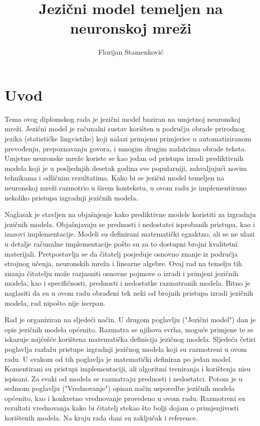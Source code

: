 \documentclass[times, utf8, diplomski, numeric]{fer}
\begin{document}
\title{Jezični model temeljen na neuronskoj mreži}

\author{Florijan Stamenković}

\maketitle



\afterpage{\null\newpage}

\tableofcontents

\chapter{Uvod}

Tema ovog diplomskog rada je jezični model baziran na umjetnoj neuronskoj mreži. Jezični model je računalni sustav korišten u području obrade prirodnog jezika (statističke lingvistike) koji nalazi primjenu primjerice u automatiziranom prevođenju, prepoznavanju govora, i mnogim drugim zadatcima obrade teksta. Umjetne neuronske mreže koriste se kao jedan od pristupa izradi prediktivnih modela koji je u posljednjih desetak godina sve popularniji, zahvaljujući novim tehnikama i odličnim rezultatima. Kako bi se jezični model temeljen na neuronskoj mreži razmotrio u širem kontekstu, u ovom radu je implementirano nekoliko pristupa izgradnji jezičnih modela.

Naglasak je stavljen na objašnjenje kako prediktivne modele koristiti za izgradnju jezičnih modela. Objašnjavaju se prednosti i nedostatci isprobanih pristupa, kao i izazovi implementacije. Modeli su definirani matematički egzaktno, ali se ne ulazi u detalje računalne implementacije pošto su za to dostupni brojni kvalitetni materijali. Pretpostavlja se da čitatelj posjeduje osnovno znanje iz područja strojnog učenja, neuronskih mreža i linearne algebre. Ovaj rad na temelju tih znanja čitatelju može razjasniti osnovne pojmove o izradi i primjeni jezičnih modela, kao i specifičnosti, prednosti i nedostatke razmatranih modela. Bitno je naglasiti da su u ovom radu obrađeni tek neki od brojnih pristupa izradi jezičnih modela, rad nipošto nije iscrpan.

Rad je organiziran na sljedeći način. U drugom poglavlju ("Jezični model") dan je opis jezičnih modela općenito. Razmatra se njihova svrha, moguće primjene te se iskazuje najčešće korištena matematička definicija jezičnog modela. Sljedeća četiri poglavlja razlažu pristupe izgradnji jezičnog modela koji su razmotreni u ovom radu. U svakom od tih poglavlja je matematički definiran po jedan model. Komentirani su pristupi implementaciji, ali algoritmi treniranja i korištenja nisu ispisani. Za svaki od modela se razmatraju prednosti i nedostatci. Potom je u sedmom poglavlju ("Vrednovanje") opisan način usporedbe jezičnih modela općenito, kao i konkretno vrednovanje provedeno u ovom radu. Razmotreni su rezultati vrednovanja kako bi čitatelj stekao što bolji dojam o primjenjivosti korištenih modela. Na kraju rada dani su zaključak i reference.
\end{document}
